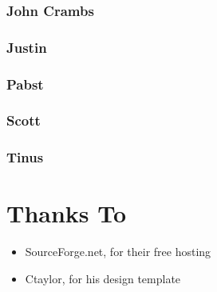 \documentclass[a4paper]{report}
\begin{document}
			\subsection{John Crambs}

			\subsection{Justin}

			\subsection{Pabst}

			\subsection{Scott}

			\subsection{Tinus}

	\chapter{Thanks To}
		
		\begin{itemize}
			\item SourceForge.net, for their free hosting
			\item Ctaylor, for his design template
		\end{itemize}
\end{document}
